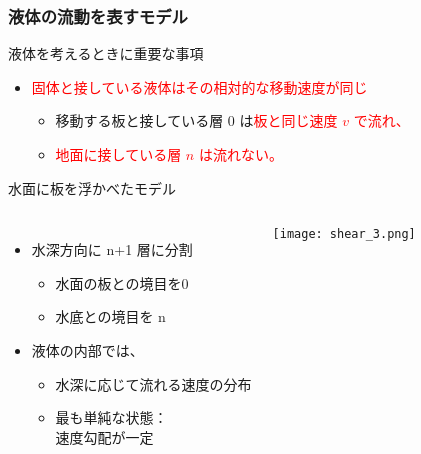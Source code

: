 \documentclass[12pt, dvipdfmx]{beamer}
\begin{document}
\begin{frame}
	\frametitle{液体の流動を表すモデル}
	\begin{block}{液体を考えるときに重要な事項}
		\begin{itemize}
			\item \textcolor{red}{固体と接している液体はその相対的な移動速度が同じ}
			\begin{itemize}
				\item 移動する板と接している層 0 は\textcolor{red}{板と同じ速度 $v$ で流れ、}
				\item \textcolor{red}{地面に接している層 $n$ は流れない。}
			\end{itemize}
		\end{itemize}
	\end{block}
	\begin{exampleblock}{水面に板を浮かべたモデル}
		\begin{columns}[T, onlytextwidth]
				\begin{itemize}
					\item 水深方向に n+1 層に分割
						\begin{itemize}
							\item 水面の板との境目を0
							\item 水底との境目を n 
						\end{itemize}
						\item 液体の内部では、
						\begin{itemize}
							\item 水深に応じて流れる速度の分布
							\item 最も単純な状態：\\速度勾配が一定
						\end{itemize}
				\end{itemize}
				\begin{center}
					\texttt{[image: shear\_3.png]}
				\end{center}
		\end{columns}
	\end{exampleblock}
\end{frame}
\end{document}
